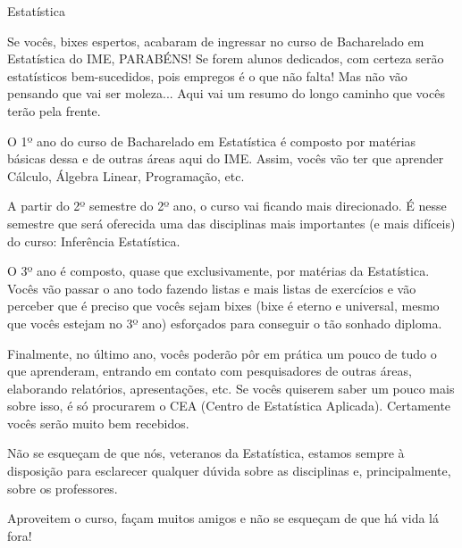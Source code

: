 \begin{subsecao}{Estatística}

Se vocês, bixes espertos, acabaram de ingressar no curso de Bacharelado em
Estatística do IME, PARABÉNS! Se forem alunos dedicados, com certeza serão
estatísticos bem-sucedidos, pois empregos é o que não falta! Mas não vão
pensando que vai ser moleza... Aqui vai um resumo do longo caminho que vocês
terão pela frente.

O 1º ano do curso de Bacharelado em Estatística é composto por matérias básicas
dessa e de outras áreas aqui do IME. Assim, vocês vão ter que aprender Cálculo,
Álgebra Linear, Programação, etc.

A partir do 2º semestre do 2º ano, o curso vai ficando mais direcionado. É nesse
semestre que será oferecida uma das disciplinas mais importantes (e mais
difíceis) do curso: Inferência Estatística.

O 3º ano é composto, quase que exclusivamente, por matérias da
Estatística. Vocês vão passar o ano todo fazendo listas e mais listas de
exercícios e vão perceber que é preciso que vocês sejam bixes (bixe é eterno e
universal, mesmo que vocês estejam no 3º ano) esforçados para conseguir o tão
sonhado diploma.

Finalmente, no último ano, vocês poderão pôr em prática um pouco de tudo o que
aprenderam, entrando em contato com pesquisadores de outras áreas, elaborando
relatórios, apresentações, etc. Se vocês quiserem saber um pouco mais sobre
isso, é só procurarem o CEA (Centro de Estatística Aplicada). Certamente vocês
serão muito bem recebidos.

Não se esqueçam de que nós, veteranos da Estatística, estamos sempre à
disposição para esclarecer qualquer dúvida sobre as disciplinas e,
principalmente, sobre os professores.

Aproveitem o curso, façam muitos amigos e não se esqueçam de que há vida lá
fora!

\end{subsecao}
